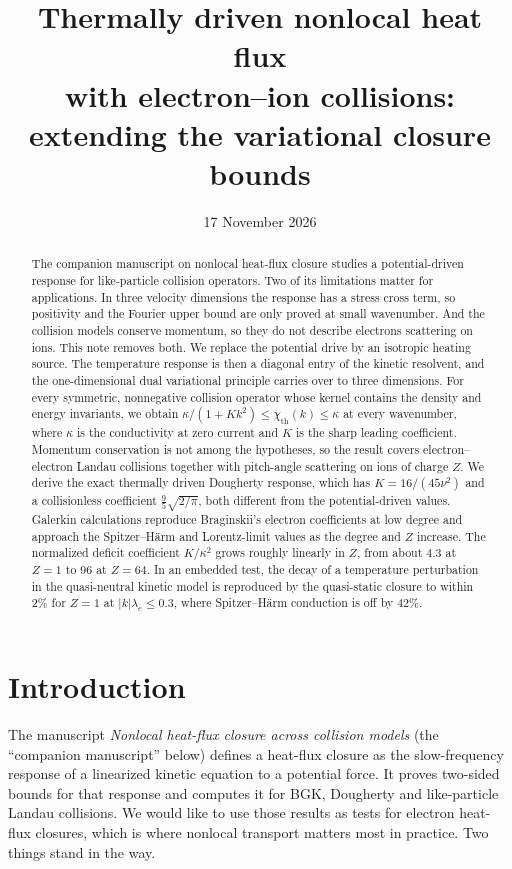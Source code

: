 \documentclass[11pt]{article}
\title{\bfseries Thermally driven nonlocal heat flux\\ with electron--ion collisions:\\
extending the variational closure bounds}
\author{}
\date{17 November 2026}
\newcommand{\kap}{\kappa}
\newcommand{\thr}{\mathrm{th}}
\theoremstyle{definition}
\theoremstyle{remark}
\numberwithin{equation}{section}
\begin{document}
\maketitle
\vspace{-1.5em}
\begin{abstract}
The companion manuscript on nonlocal heat-flux closure studies a
potential-driven response for like-particle collision operators. Two of
its limitations matter for applications. In three velocity dimensions the
response has a stress cross term, so positivity and the Fourier upper
bound are only proved at small wavenumber. And the collision models
conserve momentum, so they do not describe electrons scattering on ions.
This note removes both. We replace the potential drive
by an isotropic heating source. The temperature response is then a
diagonal entry of the kinetic resolvent, and the one-dimensional dual
variational principle carries over to three dimensions. For every
symmetric, nonnegative collision operator whose kernel contains the
density and energy invariants, we obtain
$\kap/(1+Kk^2)\leq\chi_\thr(k)\leq\kap$ at every wavenumber, where $\kap$
is the conductivity at zero current and $K$ is the sharp leading
coefficient. Momentum conservation is not among the hypotheses, so the
result covers electron--electron Landau collisions together with
pitch-angle scattering on ions of charge $Z$. We derive the exact
thermally driven Dougherty response, which has
$K=16/(45\nu^2)$ and a collisionless coefficient $\tfrac95\sqrt{2/\pi}$,
both different from the potential-driven values. Galerkin calculations
reproduce Braginskii's electron coefficients at low degree and approach
the Spitzer--H\"arm and Lorentz-limit values as the degree and $Z$
increase. The normalized deficit coefficient $K/\kap^2$ grows roughly
linearly in $Z$, from about $4.3$ at $Z=1$ to $96$ at $Z=64$. In an
embedded test, the decay of a temperature perturbation in the
quasi-neutral kinetic model is reproduced by the quasi-static closure to
within $2\%$ for $Z=1$ at $|k|\lambda_e\leq0.3$, where
Spitzer--H\"arm conduction is off by $42\%$.
\end{abstract}

\section{Introduction}

The manuscript \emph{Nonlocal heat-flux closure across collision models}
(the ``companion manuscript'' below) defines a heat-flux closure as the
slow-frequency response of a linearized kinetic equation to a potential
force. It proves two-sided bounds for that response and computes it for
BGK, Dougherty and like-particle Landau collisions. We would like to use
those results as tests for electron heat-flux closures, which is where
nonlocal transport matters most in practice. Two things stand in the way.
\end{document}
